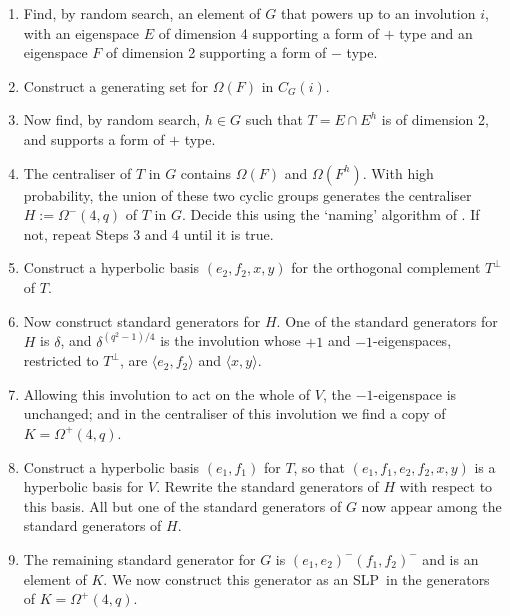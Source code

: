 \documentclass[12pt]{article}
\def\SLP{{\rm SLP}}
\begin{document}
\begin{enumerate}
\item Find, by random search, an element of $G$ that powers up to 
an involution $i$, with an eigenspace
$E$ of dimension 4 supporting a form of $+$ type and 
an eigenspace $F$ of dimension 2 supporting a form of $-$ type.

\item 
Construct a generating set for $\Omega(F)$ in $C_G(i)$. 

\item 
Now find, by random search, $h \in G$ such that 
$T=E\cap E^h$ is of dimension 2, and supports a form of $+$ type.

\item 
The centraliser of $T$ in $G$ contains $\Omega(F)$ and $\Omega(F^h)$.
With high probability, the union of these two cyclic groups 
generates the centraliser $H := \Omega^-(4,q)$  of $T$ in $G$.
Decide this using the `naming' algorithm of \cite{NP}.
If not, repeat Steps 3 and 4 until it is true.

\item 
Construct a hyperbolic basis $(e_2,f_2,x,y)$  for the orthogonal 
complement $T^\perp$ of $T$.  

\item 
Now construct standard generators for $H$.  
One of the standard generators for $H$ is $\delta$, 
and $\delta^{(q^2-1)/4}$ is 
the involution whose $+1$ and $-1$-eigenspaces,
restricted to $T^\perp$, are
$\langle e_2,f_2\rangle $ and $\langle x,y \rangle$.  

\item 
Allowing this involution to act on the whole of $V$, the $-1$-eigenspace
is unchanged; and in the centraliser of this involution we find a copy 
of $K=\Omega^+(4,q)$.  

\item 
Construct a hyperbolic basis $(e_1,f_1)$ for $T$, 
so that $(e_1,f_1,e_2,f_2,x,y)$ is a hyperbolic basis for $V$.  
Rewrite the standard generators of $H$ with respect to this basis.
All but one of the standard generators of $G$ now appear among the 
standard generators of $H$.

\item 
The remaining standard generator for $G$ 
is $(e_1,e_2)^-(f_1,f_2)^-$ and is an element of $K$.  
We now construct this generator
as an \SLP\ in the generators of $K = \Omega^+(4, q)$. 
\end{enumerate}
\end{document}
